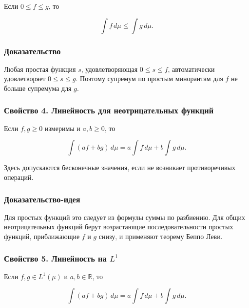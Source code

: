 \documentclass[
  11pt,
  a4paper,
]{article}
\begin{document}
Если \(0\le f\le g\), то

\[
\int f\,d\mu\le\int g\,d\mu.
\]

\subsubsection{Доказательство}\label{ux434ux43eux43aux430ux437ux430ux442ux435ux43bux44cux441ux442ux432ux43e}

Любая простая функция \(s\), удовлетворяющая \(0\le s\le f\),
автоматически удовлетворяет \(0\le s\le g\). Поэтому супремум по простым
минорантам для \(f\) не больше супремума для \(g\).

\subsubsection{Свойство 4. Линейность для неотрицательных
функций}\label{ux441ux432ux43eux439ux441ux442ux432ux43e-4.-ux43bux438ux43dux435ux439ux43dux43eux441ux442ux44c-ux434ux43bux44f-ux43dux435ux43eux442ux440ux438ux446ux430ux442ux435ux43bux44cux43dux44bux445-ux444ux443ux43dux43aux446ux438ux439}

Если \(f,g\ge0\) измеримы и \(a,b\ge0\), то

\[
\int(af+bg)\,d\mu
=
a\int f\,d\mu+b\int g\,d\mu.
\]

Здесь допускаются бесконечные значения, если не возникает противоречивых
операций.

\subsubsection{Доказательство-идея}\label{ux434ux43eux43aux430ux437ux430ux442ux435ux43bux44cux441ux442ux432ux43e-ux438ux434ux435ux44f-1}

Для простых функций это следует из формулы суммы по разбиению. Для общих
неотрицательных функций берут возрастающие последовательности простых
функций, приближающие \(f\) и \(g\) снизу, и применяют теорему Беппо
Леви.

\subsubsection{\texorpdfstring{Свойство 5. Линейность на
\(L^1\)}{Свойство 5. Линейность на L\^{}1}}\label{ux441ux432ux43eux439ux441ux442ux432ux43e-5.-ux43bux438ux43dux435ux439ux43dux43eux441ux442ux44c-ux43dux430-l1}

Если \(f,g\in L^1(\mu)\) и \(a,b\in\mathbb R\), то

\[
\int(af+bg)\,d\mu
=
a\int f\,d\mu+b\int g\,d\mu.
\]
\end{document}
